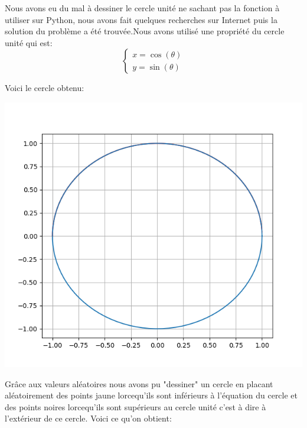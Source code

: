 \documentclass{article}
\begin{document}
Nous avons eu du mal à dessiner le cercle unité ne sachant pas la fonction à utiliser sur Python, nous avons fait quelques recherches sur Internet puis la solution du problème a été trouvée.Nous avons utilisé une propriété du cercle unité qui est: 
\begin{equation}
\label{harmonic}
\left\{
\begin{array}{ccc}
x=\cos(\theta)\\
y=\sin(\theta)
\end{array}
\right.
\end{equation}
\begin{center}
Voici le cercle obtenu:
\end{center}
\begin{center}
    \includegraphics[scale=0.5]{figure_1-1.png}
\end{center}

Grâce aux valeurs aléatoires nous avons pu "dessiner" un cercle en placant aléatoirement des points jaune lorcequ'ils sont inférieurs à l'équation du cercle et des points noires lorcequ'ils sont supérieurs au cercle unité c'est à dire à l'extérieur de ce cercle.
Voici ce qu'on obtient:
\end{document}
